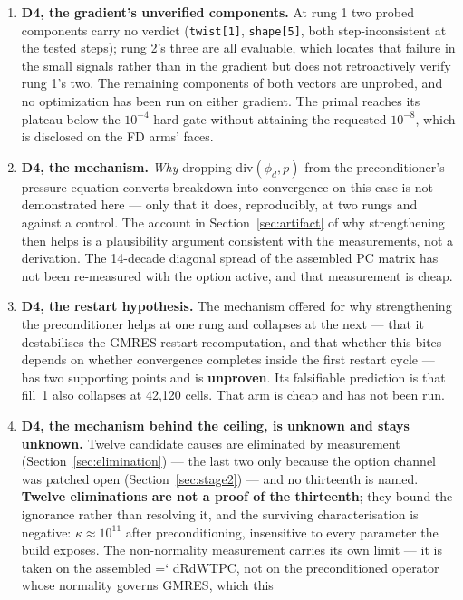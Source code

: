 \documentclass[11pt,a4paper]{article}
\newcommand{\artifact}[1]{{\small\ttfamily\hyphenchar\font=`\-\relax
  \def\_{\textunderscore\allowbreak}#1}}
\begin{document}
\begin{enumerate}
one notch weaker of \texttt{dgmres}, declined in stage 2's filing on the ground that it shares
arm 1's family and mechanism.
\item \textbf{D4, the gradient's unverified components.} At rung 1 two probed components carry
no verdict (\texttt{twist[1]}, \texttt{shape[5]}, both step-inconsistent at the tested steps);
rung 2's three are all evaluable, which locates that failure in the small signals rather than
in the gradient but does not retroactively verify rung 1's two. The remaining components of
both vectors are unprobed, and no optimization has been run on either gradient. The primal
reaches its plateau below the \(10^{-4}\) hard gate without attaining the requested
\(10^{-8}\), which is disclosed on the FD arms' faces.
\item \textbf{D4, the mechanism.} \emph{Why} dropping \(\mathrm{div}(\phi_d,p)\) from the
preconditioner's pressure equation converts breakdown into convergence on this case is not
demonstrated here --- only that it does, reproducibly, at two rungs and against a control. The
account in Section~\ref{sec:artifact} of why strengthening then helps is a plausibility
argument consistent with the measurements, not a derivation. The 14-decade diagonal spread of
the assembled PC matrix has not been re-measured with the option active, and that measurement
is cheap.
\item \textbf{D4, the restart hypothesis.} The mechanism offered for why strengthening the
preconditioner helps at one rung and collapses at the next --- that it destabilises the GMRES
restart recomputation, and that whether this bites depends on whether convergence completes
inside the first restart cycle --- has two supporting points and is \textbf{unproven}. Its
falsifiable prediction is that fill~1 also collapses at 42{,}120 cells. That arm is cheap and
has not been run.
\item \textbf{D4, the mechanism behind the ceiling, is unknown and stays unknown.} Twelve
candidate causes are eliminated by measurement (Section~\ref{sec:elimination}) --- the last two
only because the option channel was patched open (Section~\ref{sec:stage2}) --- and no
thirteenth is named. \textbf{Twelve eliminations are not a proof of the thirteenth}; they bound the
ignorance rather than resolving it, and the surviving characterisation is negative:
\(\kappa\approx10^{11}\) after preconditioning, insensitive to every parameter the build
exposes. The non-normality measurement carries its own limit --- it is taken on the assembled
\artifact{dRdWTPC}, not on the preconditioned operator whose normality governs GMRES, which this

\end{enumerate}
\end{document}
